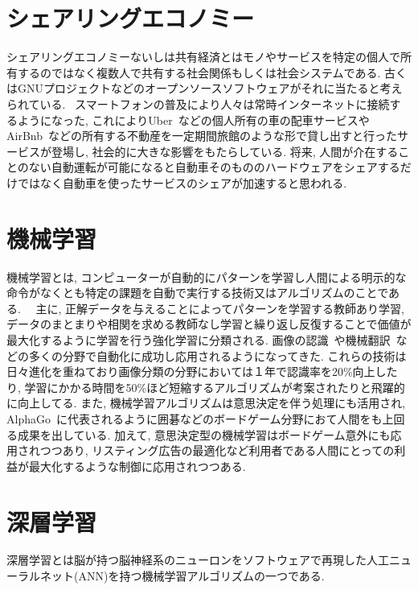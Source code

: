 \section{シェアリングエコノミー}

シェアリングエコノミー\cite{Sharing}ないしは共有経済とはモノやサービスを特定の個人で所有するのではなく複数人で共有する社会関係もしくは社会システムである.
古くはGNUプロジェクトなどのオープンソースソフトウェアがそれに当たると考えられている.~\cite{GNU}
スマートフォンの普及により人々は常時インターネットに接続するようになった, これによりUber~\cite{Uber}などの個人所有の車の配車サービスやAirBnb~\cite{AirBnB}などの所有する不動産を一定期間旅館のような形で貸し出すと行ったサービスが登場し,
社会的に大きな影響をもたらしている.
将来, 人間が介在することのない自動運転が可能になると自動車そのもののハードウェアをシェアするだけではなく自動車を使ったサービスのシェアが加速すると思われる.


\section{機械学習}

機械学習とは, コンピューターが自動的にパターンを学習し人間による明示的な命令がなくとも特定の課題を自動で実行する技術又はアルゴリズムのことである.~\cite{MachineLearning}~\cite{MachineLearning2}
主に, 正解データを与えることによってパターンを学習する教師あり学習,
データのまとまりや相関を求める教師なし学習と繰り返し反復することで価値が最大化するように学習を行う強化学習に分類される.
画像の認識~\cite{ImageRecognization}や機械翻訳~\cite{Translation}などの多くの分野で自動化に成功し応用されるようになってきた.
これらの技術は日々進化を重ねており画像分類の分野においては１年で認識率を20\%向上したり, 学習にかかる時間を50\%ほど短縮するアルゴリズムが考案されたりと飛躍的に向上してる.
また, 機械学習アルゴリズムは意思決定を伴う処理にも活用され, AlphaGo~\cite{AlphaGo}に代表されるように囲碁などのボードゲーム分野におて人間をも上回る成果を出している.
加えて, 意思決定型の機械学習はボードゲーム意外にも応用されつつあり, リスティング広告の最適化など利用者である人間にとっての利益が最大化するような制御に応用されつつある.
 


\section{深層学習}

深層学習とは脳が持つ脳神経系のニューロンをソフトウェアで再現した人工ニューラルネット(ANN)を持つ機械学習アルゴリズムの一つである.

